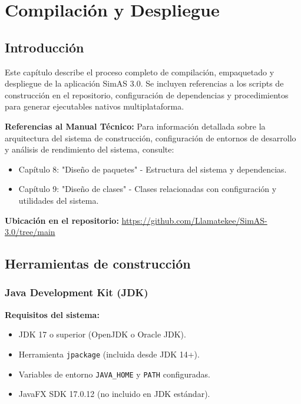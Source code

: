\chapter{Compilación y Despliegue}\label{cap-compilacion-despliegue}

\section{Introducción}

Este capítulo describe el proceso completo de compilación, empaquetado y despliegue de la aplicación SimAS 3.0. Se incluyen referencias a los scripts de construcción en el repositorio, configuración de dependencias y procedimientos para generar ejecutables nativos multiplataforma.

\textbf{Referencias al Manual Técnico:} Para información detallada sobre la arquitectura del sistema de construcción, configuración de entornos de desarrollo y análisis de rendimiento del sistema, consulte:
\begin{itemize}
    \item Capítulo 8: "Diseño de paquetes" - Estructura del sistema y dependencias.
    \item Capítulo 9: "Diseño de clases" - Clases relacionadas con configuración y utilidades del sistema.
\end{itemize}

\textbf{Ubicación en el repositorio:} \url{https://github.com/Llamatekee/SimAS-3.0/tree/main}

\section{Herramientas de construcción}

\subsection{Java Development Kit (JDK)}

\textbf{Requisitos del sistema:}
\begin{itemize}
    \item JDK 17 o superior (OpenJDK o Oracle JDK).
    \item Herramienta \texttt{jpackage} (incluida desde JDK 14+).
    \item Variables de entorno \verb|JAVA_HOME| y \verb|PATH| configuradas.
    \item JavaFX SDK 17.0.12 (no incluido en JDK estándar).
\end{itemize}


